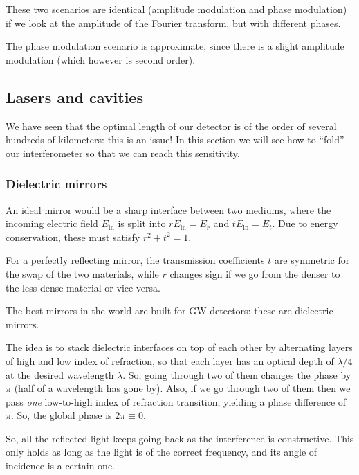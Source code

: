 \documentclass[main.tex]{subfiles}
\begin{document}
These two scenarios are identical (amplitude modulation and phase modulation) if we look at the amplitude of the Fourier transform, but with different phases. 

The phase modulation scenario is approximate, since there is a slight amplitude modulation (which however is second order). 

\subsection{Lasers and cavities}

We have seen that the optimal length of our detector is of the order of several hundreds of kilometers: this is an issue! In this section we will see how to ``fold'' our interferometer so that we can reach this sensitivity.

\subsubsection{Dielectric mirrors}

An ideal mirror would be a sharp interface between two mediums, where the incoming electric field \(E _{\text{in}}\) is split into \(r E _{\text{in}} = E_r\) and \(t E _{\text{in}} = E_{t}\). Due to energy conservation, these must satisfy \(r^2+t^2 = 1\). 

For a perfectly reflecting mirror, the transmission coefficients \(t\) are symmetric for the swap of the two materials, while \(r\) changes sign if we go from the denser to the less dense material or vice versa. 

The best mirrors in the world are built for GW detectors: these are dielectric mirrors. 

The idea is to stack dielectric interfaces on top of each other by alternating layers of high and low index of refraction, so that each layer has an optical depth of \(\lambda /4\) at the desired wavelength \(\lambda \). 
So, going through two of them changes the phase by \(\pi \) (half of a wavelength has gone by). Also, if we go through two of them then we pass \emph{one} low-to-high index of refraction transition, yielding a phase difference of \(\pi \). So, the global phase is \(2 \pi \equiv 0\). 

So, all the reflected light keeps going back as the interference is constructive.
This only holds as long as the light is of the correct frequency, and its angle of incidence is a certain one.

\end{document}
